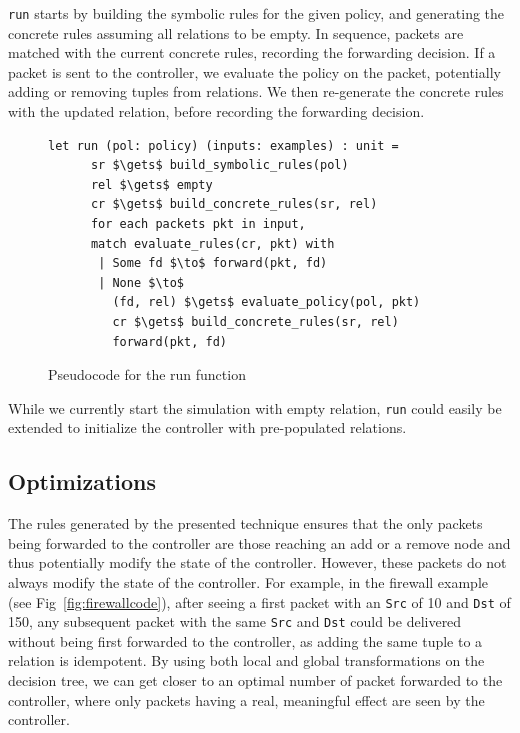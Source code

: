 \documentclass[nocopyrightspace]{sigplanconf}
\begin{document}
\lstinline|run| starts by building the symbolic rules for the given policy, and generating the concrete rules assuming all relations to be empty. In sequence, packets are matched with the current concrete rules, recording the forwarding decision. If a packet is sent to the controller, we evaluate the policy on the packet, potentially adding or removing tuples from relations. We then re-generate the concrete rules with the updated relation, before recording the forwarding decision.

\begin{figure}[ht]
\begin{lstlisting}[mathescape]
let run (pol: policy) (inputs: examples) : unit =
      sr $\gets$ build_symbolic_rules(pol)
      rel $\gets$ empty
      cr $\gets$ build_concrete_rules(sr, rel)
      for each packets pkt in input,
      match evaluate_rules(cr, pkt) with
       | Some fd $\to$ forward(pkt, fd)
       | None $\to$
         (fd, rel) $\gets$ evaluate_policy(pol, pkt)
         cr $\gets$ build_concrete_rules(sr, rel)
         forward(pkt, fd)     
\end{lstlisting}

\caption{Pseudocode for the run function}
\label{fig:run-pseudo}
  \end{figure}

While we currently start the simulation with empty relation, \lstinline|run| could easily be extended to initialize the controller with pre-populated relations. 



\subsection*{Optimizations}
The rules generated by the presented technique ensures that the only packets being forwarded to the controller are those reaching an add or a remove node and thus potentially modify the state of the controller. However, these packets do not always modify the state of the controller. For example, in the firewall example (see Fig~\ref{fig:firewallcode}), after seeing a first packet with an \lstinline|Src| of 10 and \lstinline|Dst| of 150, any subsequent packet with the same \lstinline|Src| and \lstinline|Dst| could be delivered without being first forwarded to the controller, as adding the same tuple to a relation is idempotent. By using both local and global transformations on the decision tree, we can get closer to an optimal number of packet forwarded to the controller, where only packets having a real, meaningful effect are seen by the controller.
\end{document}
